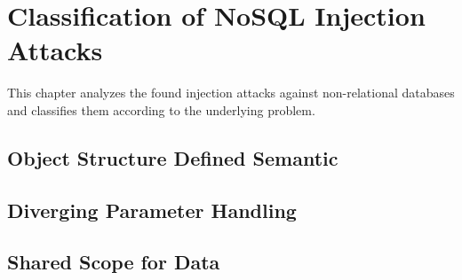 \chapter{Classification of NoSQL Injection Attacks}
\label{cha:classification}
This chapter analyzes the found injection attacks against non-relational databases and classifies them according to the underlying problem.

\section{Object Structure Defined Semantic}


\section{Diverging Parameter Handling}


\section{Shared Scope for Data}


